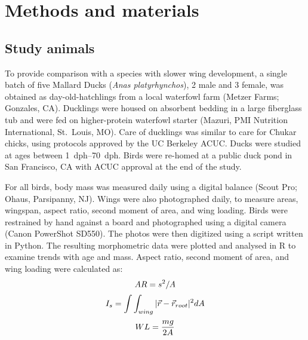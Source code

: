 \documentclass[10pt]{article}
\newcommand{\Anasplatyrhynchos}{\emph{Anas platyrhynchos}}
\begin{document}
\section{Methods and materials}
\subsection{Study animals}
To provide comparison with a species with slower wing development, a single batch of five Mallard Ducks (\Anasplatyrhynchos), 2 male and 3 female, was obtained as day-old-hatchlings from a local waterfowl farm (Metzer Farms; Gonzales, CA). Ducklings were housed on absorbent bedding in a large fiberglass tub and were fed on higher-protein waterfowl starter (Mazuri, PMI Nutrition International, St.\ Louis, MO).  Care of ducklings was similar to care for Chukar chicks, using protocols approved by the UC Berkeley ACUC.  Ducks were studied at ages between \SIrange{1}{70}{dph}. Birds were re-homed at a public duck pond in San Francisco, CA with ACUC approval at the end of the study. 

For all birds, body mass was measured daily using a digital balance (Scout Pro; Ohaus, Parsipanny, NJ).  Wings were also photographed daily, to measure areas, wingspan, aspect ratio, second moment of area, and wing loading.  Birds were restrained by hand against a board and photographed using a digital camera (Canon PowerShot SD550).  The photos were then digitized using a script written in Python. The resulting morphometric data were plotted and analysed in R \citep{R:2013} to examine trends with age and mass.  Aspect ratio, second moment of area, and wing loading were calculated as:
\begin{equation}
AR = s^2/A
\index{aspect ratio}
\end{equation}
\begin{equation}
I_s = \int\int_{wing} |\vec r - \vec r_{root}|^2 dA
\index{second moment of area}
\end{equation}
\begin{equation}
WL = \frac{mg}{2A}
\index{wing loading}
\end{equation}
\end{document}

